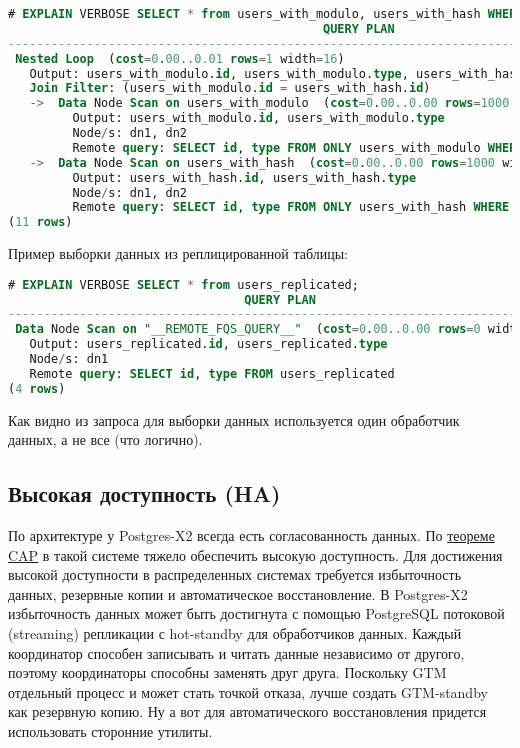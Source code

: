 \begin{lstlisting}[language=SQL,label=lst:postgres-x28,caption=Выборка записей из распределенной таблицы]
# EXPLAIN VERBOSE SELECT * from users_with_modulo, users_with_hash WHERE users_with_modulo.id = users_with_hash.id;
                                            QUERY PLAN
--------------------------------------------------------------------------------------------------
 Nested Loop  (cost=0.00..0.01 rows=1 width=16)
   Output: users_with_modulo.id, users_with_modulo.type, users_with_hash.id, users_with_hash.type
   Join Filter: (users_with_modulo.id = users_with_hash.id)
   ->  Data Node Scan on users_with_modulo  (cost=0.00..0.00 rows=1000 width=8)
         Output: users_with_modulo.id, users_with_modulo.type
         Node/s: dn1, dn2
         Remote query: SELECT id, type FROM ONLY users_with_modulo WHERE true
   ->  Data Node Scan on users_with_hash  (cost=0.00..0.00 rows=1000 width=8)
         Output: users_with_hash.id, users_with_hash.type
         Node/s: dn1, dn2
         Remote query: SELECT id, type FROM ONLY users_with_hash WHERE true
(11 rows)
\end{lstlisting}

Пример выборки данных из реплицированной таблицы:

\begin{lstlisting}[language=SQL,label=lst:postgres-x222,caption=Выборка записей из реплицированной таблицы]
# EXPLAIN VERBOSE SELECT * from users_replicated;
                                 QUERY PLAN
----------------------------------------------------------------------------
 Data Node Scan on "__REMOTE_FQS_QUERY__"  (cost=0.00..0.00 rows=0 width=0)
   Output: users_replicated.id, users_replicated.type
   Node/s: dn1
   Remote query: SELECT id, type FROM users_replicated
(4 rows)
\end{lstlisting}

Как видно из запроса для выборки данных используется один обработчик данных, а не все (что логично).

\subsection{Высокая доступность (HA)}

По архитектуре у Postgres-X2 всегда есть согласованность данных. По \href{http://en.wikipedia.org/wiki/CAP\_theorem}{теореме CAP} в такой системе тяжело обеспечить высокую доступность. Для достижения высокой доступности в распределенных системах требуется избыточность данных, резервные копии и автоматическое восстановление. В Postgres-X2 избыточность данных может быть достигнута с помощью PostgreSQL потоковой (streaming) репликации с hot-standby для обработчиков данных. Каждый координатор способен записывать и читать данные независимо от другого, поэтому координаторы способны заменять друг друга. Поскольку GTM отдельный процесс и может стать точкой отказа, лучше создать GTM-standby как резервную копию. Ну а вот для автоматического восстановления придется использовать сторонние утилиты.

